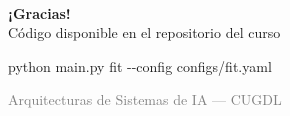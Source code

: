 \documentclass[aspectratio=169,10pt]{beamer}
\newcommand{\faIcon}[1]{\textbullet}
\begin{document}
\begin{frame}[plain]
    \begin{center}
        \vspace{1cm}
        {\Huge \faIcon{paw}}\\[12pt]
        {\LARGE \textbf{¡Gracias!}}\\[16pt]
        {\large Código disponible en el repositorio del curso}\\[8pt]
        \begin{tcolorbox}[colback=lightgray, colframe=pyblue!60, width=0.7\textwidth]
            \centering\ttfamily\small
            python main.py fit -{}-config configs/fit.yaml
        \end{tcolorbox}
        \vspace{12pt}
        {\small \textcolor{gray}{Arquitecturas de Sistemas de IA --- CUGDL}}
    \end{center}
\end{frame}
\end{document}
